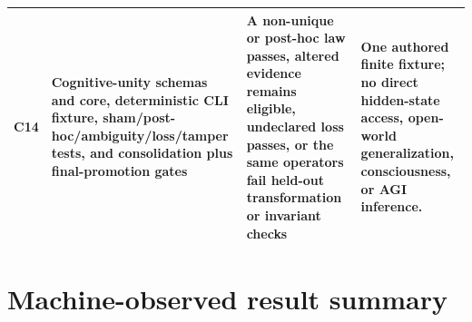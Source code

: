 \documentclass[10pt,twocolumn]{article}
\theoremstyle{definition}
\theoremstyle{plain}
\theoremstyle{remark}
\newcommand{\claimid}[1]{\textsf{\textbf{#1}}}
\begin{document}
\begin{table}[!t]
\begin{tabularx}{\textwidth}{@{}p{}p{}p{}X@{}}
\claimid{C14} & Cognitive-unity schemas and core, deterministic CLI fixture, sham/post-hoc/ambiguity/loss/tamper tests, and consolidation plus final-promotion gates & A non-unique or post-hoc law passes, altered evidence remains eligible, undeclared loss passes, or the same operators fail held-out transformation or invariant checks & One authored finite fixture; no direct hidden-state access, open-world generalization, consciousness, or AGI inference. \\
\bottomrule
\end{tabularx}
\end{table}

\section{Machine-observed result summary}
\label{app:summary}
\end{document}
